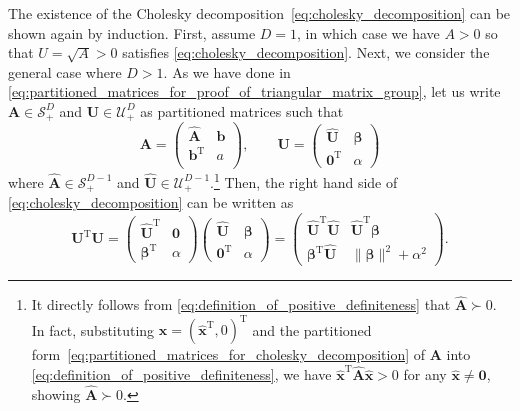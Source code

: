 \documentclass[12pt,a4paper]{article}
\begin{document}
The existence of the Cholesky decomposition~\eqref{eq:cholesky_decomposition}
can be shown again by induction.
First, assume $D = 1$, in which case we have $A > 0$ so that
$U = \sqrt{A} > 0$ satisfies \eqref{eq:cholesky_decomposition}.
Next, we consider the general case where $D > 1$.
As we have done in \eqref{eq:partitioned_matrices_for_proof_of_triangular_matrix_group},
let us write $\mathbf{A} \in \mathcal{S}_{+}^{D}$ and $\mathbf{U} \in \mathcal{U}_{+}^{D}$
as partitioned matrices such that
\begin{equation}
\mathbf{A} =
\begin{pmatrix}
\widehat{\mathbf{A}} & \mathbf{b} \\
\mathbf{b}^{\operatorname{T}} & a \\
\end{pmatrix} , \qquad
\mathbf{U} =
\begin{pmatrix}
\widehat{\mathbf{U}} & \bm{\beta} \\
\mathbf{0}^{\operatorname{T}} & \alpha
\end{pmatrix}
\label{eq:partitioned_matrices_for_cholesky_decomposition}
\end{equation}
where $\widehat{\mathbf{A}} \in \mathcal{S}_{+}^{D - 1}$ and
$\widehat{\mathbf{U}} \in \mathcal{U}_{+}^{D - 1}$.\footnote{%
It directly follows from \eqref{eq:definition_of_positive_definiteness}
that $\widehat{\mathbf{A}} \succ 0$.
In fact, substituting
$\mathbf{x} = \left(\widehat{\mathbf{x}}^{\operatorname{T}}, 0\right)^{\operatorname{T}}$ and
the partitioned form~\eqref{eq:partitioned_matrices_for_cholesky_decomposition} of $\mathbf{A}$
into \eqref{eq:definition_of_positive_definiteness},
we have $\widehat{\mathbf{x}}^{\operatorname{T}}\widehat{\mathbf{A}}\widehat{\mathbf{x}} > 0$
for any $\widehat{\mathbf{x}} \neq \mathbf{0}$, showing $\widehat{\mathbf{A}} \succ 0$.}
Then, the right hand side of \eqref{eq:cholesky_decomposition} can be written as
\begin{equation}
\mathbf{U}^{\operatorname{T}}\mathbf{U} =
\begin{pmatrix}
\widehat{\mathbf{U}}^{\operatorname{T}} & \mathbf{0} \\
\bm{\beta}^{\operatorname{T}} & \alpha
\end{pmatrix}
\begin{pmatrix}
\widehat{\mathbf{U}} & \bm{\beta} \\
\mathbf{0}^{\operatorname{T}} & \alpha
\end{pmatrix}
=
\begin{pmatrix}
\widehat{\mathbf{U}}^{\operatorname{T}}\widehat{\mathbf{U}} &
\widehat{\mathbf{U}}^{\operatorname{T}}\bm{\beta} \\
\bm{\beta}^{\operatorname{T}}\widehat{\mathbf{U}} &
\|\bm{\beta}\|^{2} + \alpha^{2}
\end{pmatrix} \label{eq:rhs_of_cholesky_decomposition} .
\end{equation}
\end{document}
